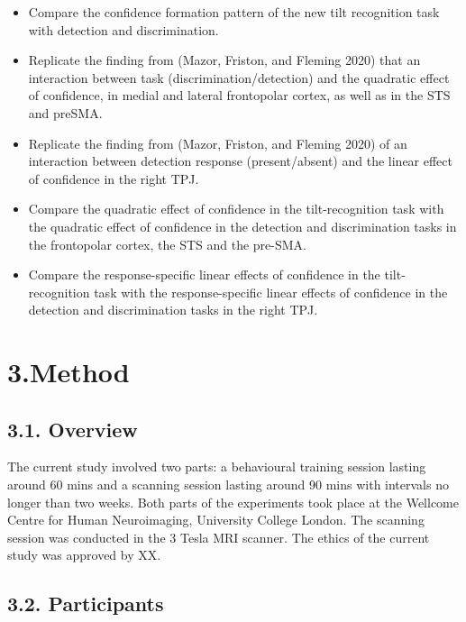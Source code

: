 \documentclass[
]{article}
\begin{document}
\begin{itemize}
\item
  Compare the confidence formation pattern of the new tilt recognition
  task with detection and discrimination.
\item
  Replicate the finding from (Mazor, Friston, and Fleming 2020) that an
  interaction between task (discrimination/detection) and the quadratic
  effect of confidence, in medial and lateral frontopolar cortex, as
  well as in the STS and preSMA.
\item
  Replicate the finding from (Mazor, Friston, and Fleming 2020) of an
  interaction between detection response (present/absent) and the linear
  effect of confidence in the right TPJ.
\item
  Compare the quadratic effect of confidence in the tilt-recognition
  task with the quadratic effect of confidence in the detection and
  discrimination tasks in the frontopolar cortex, the STS and the
  pre-SMA.
\item
  Compare the response-specific linear effects of confidence in the
  tilt- recognition task with the response-specific linear effects of
  confidence in the detection and discrimination tasks in the right TPJ.
\end{itemize}

\hypertarget{method}{%
\section{3.Method}\label{method}}

\hypertarget{overview}{%
\subsection{3.1. Overview}\label{overview}}

The current study involved two parts: a behavioural training session
lasting around 60 mins and a scanning session lasting around 90 mins
with intervals no longer than two weeks. Both parts of the experiments
took place at the Wellcome Centre for Human Neuroimaging, University
College London. The scanning session was conducted in the 3 Tesla MRI
scanner. The ethics of the current study was approved by XX.

\hypertarget{participants}{%
\subsection{3.2. Participants}\label{participants}}
\end{document}
